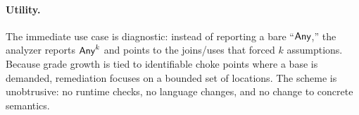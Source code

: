 \paragraph{Utility.}
The immediate use case is diagnostic: instead of reporting a bare ``\(\mathsf{Any}\),'' the analyzer reports \(\mathsf{Any}^{k}\) and points to the joins/uses that forced \(k\) assumptions.
Because grade growth is tied to identifiable choke points where a base is demanded, remediation focuses on a bounded set of locations.
The scheme is unobtrusive: no runtime checks, no language changes, and no change to concrete semantics.
